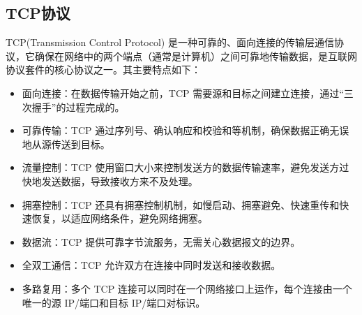 \documentclass[UTF8,a4paper,10pt]{ctexart}
\begin{document}
\subsection{TCP协议}

TCP(Transmission Control Protocol) 是一种可靠的、面向连接的传输层通信协议，它确保在网络中的两个端点（通常是计算机）之间可靠地传输数据，是互联网协议套件的核心协议之一。其主要特点如下：
\begin{itemize}

\item 面向连接：在数据传输开始之前，TCP 需要源和目标之间建立连接，通过“三次握手”的过程完成的。

\item 可靠传输：TCP 通过序列号、确认响应和校验和等机制，确保数据正确无误地从源传送到目标。

\item 流量控制：TCP 使用窗口大小来控制发送方的数据传输速率，避免发送方过快地发送数据，导致接收方来不及处理。

\item 拥塞控制：TCP 还具有拥塞控制机制，如慢启动、拥塞避免、快速重传和快速恢复，以适应网络条件，避免网络拥塞。

\item 数据流：TCP 提供可靠字节流服务，无需关心数据报文的边界。

\item 全双工通信：TCP 允许双方在连接中同时发送和接收数据。

\item 多路复用：多个 TCP 连接可以同时在一个网络接口上运作，每个连接由一个唯一的源 IP/端口和目标 IP/端口对标识。

\end{itemize}
\end{document}
